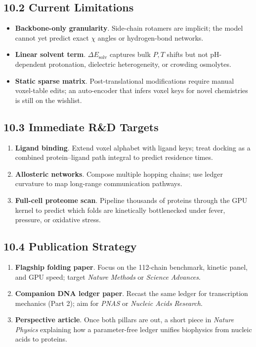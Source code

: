 \documentclass[11pt]{article}
\begin{document}
\subsection*{10.2  Current Limitations}

\begin{itemize}\setlength\itemsep{4pt}
\item \textbf{Backbone-only granularity}.  
      Side-chain rotamers are implicit; the model cannot yet predict
      exact \(\chi\) angles or hydrogen-bond networks.
\item \textbf{Linear solvent term}.  
      $\Delta E_{\text{solv}}$ captures bulk $P,T$ shifts but not
      pH-dependent protonation, dielectric heterogeneity, or crowding
      osmolytes.
\item \textbf{Static sparse matrix}.  
      Post-translational modifications require manual voxel-table edits;
      an auto-encoder that infers voxel keys for novel chemistries is
      still on the wishlist.
\end{itemize}

\subsection*{10.3  Immediate R\&D Targets}

\begin{enumerate}\setlength\itemsep{3pt}
\item \textbf{Ligand binding}.  
      Extend voxel alphabet with ligand keys; treat docking as a
      combined protein–ligand path integral to predict residence times.
\item \textbf{Allosteric networks}.  
      Compose multiple hopping chains; use ledger curvature to map
      long-range communication pathways.
\item \textbf{Full-cell proteome scan}.  
      Pipeline thousands of proteins through the GPU kernel to predict
      which folds are kinetically bottlenecked under fever, pressure, or
      oxidative stress.
\end{enumerate}

\subsection*{10.4  Publication Strategy}

\begin{enumerate}\setlength\itemsep{3pt}
\item \textbf{Flagship folding paper}.  
      Focus on the 112-chain benchmark, kinetic panel, and GPU speed;
      target \emph{Nature Methods} or \emph{Science Advances}.
\item \textbf{Companion DNA ledger paper}.  
      Recast the same ledger for transcription mechanics (Part 2); aim
      for \emph{PNAS} or \emph{Nucleic Acids Research}.
\item \textbf{Perspective article}.  
      Once both pillars are out, a short piece in \emph{Nature Physics}
      explaining how a parameter-free ledger unifies biophysics from
      nucleic acids to proteins.
\end{enumerate}
\end{document}
